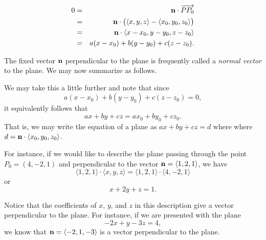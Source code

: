 \begin{eqnarray*}
  0 & = & \mathbf{n}\cdot\overrightarrow{PP_0}  \\
     & = & \mathbf{n}\cdot \big(\langle x,y,z \rangle - \langle x_0, y_0,
    z_0\rangle\big)  \\
     &=& \mathbf{n} \cdot \langle x-x_0, y-y_0, z-z_0 \rangle  \\
     &=& a(x-x_0) + b(y-y_0) + c(z-z_0). \\
\end{eqnarray*}

The fixed vector $\mathbf{n}$ perpendicular to the plane is frequently called
a {\em normal vector} to the plane.  We may now summarize as follows.

\vspace*{5pt}
\nin {}
\vspace*{5pt}

We may take this a little further and note that since
\begin{equation*}
  a(x-x_0) + b(y-y_0) + c(z-z_0) = 0, 
\end{equation*}
it equivalently follows that
\begin{equation*}
  ax + by + cz = ax_0+by_0+cz_0.
\end{equation*}
That is, we may write the equation of a plane as $ax+by+cz = d$ where
where $d = \mathbf{n}\cdot\langle x_0,y_0,z_0\rangle$.  

For instance, if we would like to describe the plane passing through
the point $P_0=(4, -2,1)$ and perpendicular to the vector $\mathbf{n} =
\langle 1, 2, 1 \rangle$, we have
$$
  \langle 1,2,1 \rangle\cdot \langle x,y,z\rangle =
  \langle 1,2,1 \rangle\cdot \langle 4,-2,1\rangle 
$$
or
$$
x + 2y + z = 1.
$$

Notice that the coefficients of $x$, $y$, and $z$ in this description
give a vector perpendicular to the plane.  For instance, if we are
presented with the plane
$$
-2x + y - 3z = 4,
$$
we know that $\mathbf{n} = \langle -2, 1, -3\rangle$ is a vector
perpendicular to the plane.
  


